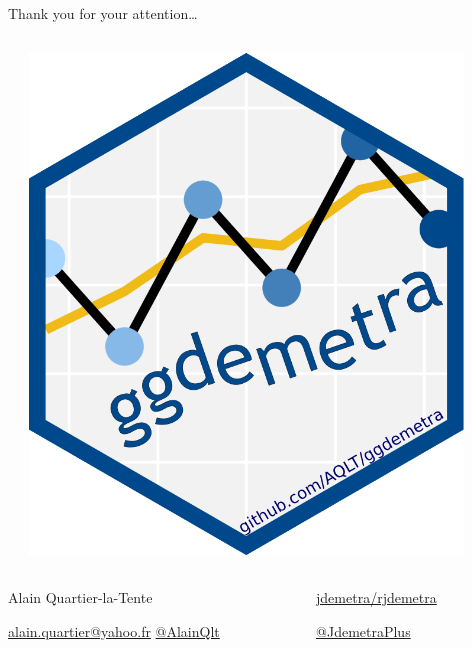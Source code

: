 \documentclass[10pt,xcolor=table,color={dvipsnames,usenames},ignorenonframetext,usepdftitle=false,french]{beamer}
\begin{document}
\begin{frame}{Thank you for your attention\ldots{}}
\begin{columns}
\begin{column}{0.33\textwidth}
\begin{center}
\end{center}
\end{column}
\begin{column}{0.33\textwidth} 
\begin{center}
\includegraphics[width=0.9\textwidth]{img/ggdemetra_logo.png}
\end{center}
\end{column}
\end{columns}

\bigskip
\bigskip

\begin{columns}
\begin{column}{0.5\textwidth}
Alain Quartier-la-Tente

\href{mailto:alain.quartier@yahoo.fr}{\faEnvelope{} alain.quartier@yahoo.fr} 
\href{https://twitter.com/AlainQlt}{\faTwitter{} @AlainQlt}
\end{column}
\begin{column}{0.5\textwidth} 
\href{https://github.com/jdemetra/rjdemetra}{\faGithub{} jdemetra/rjdemetra}  

\href{https://twitter.com/JDemetraPlus}{\faTwitter{} @JdemetraPlus}

\end{column}
\end{columns}

\end{frame}
\end{document}
